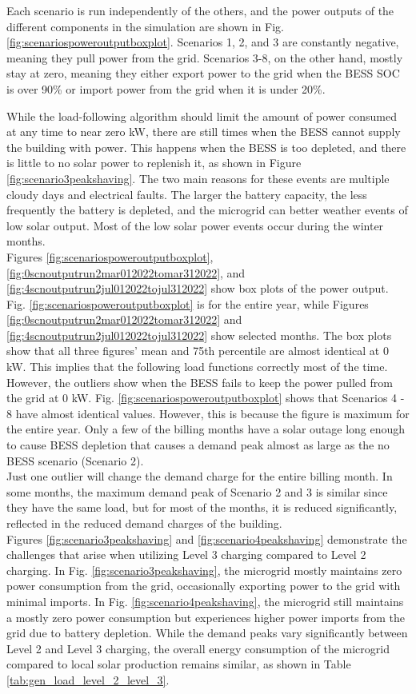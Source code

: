 \documentclass[conference, usletter]{IEEEtran}
\begin{document}
Each scenario is run independently of the others, and the power outputs of the different components in the simulation are shown in Fig. \ref{fig:scenariospoweroutputboxplot}. Scenarios 1, 2, and 3 are constantly negative, meaning they pull power from the grid. Scenarios 3-8, on the other hand, mostly stay at zero, meaning they either export power to the grid when the BESS SOC is over 90\% or import power from the grid when it is under 20\%.

While the load-following algorithm should limit the amount of power consumed at any time to near zero kW, there are still times when the BESS cannot supply the building with power. This happens when the BESS is too depleted, and there is little to no solar power to replenish it, as shown in Figure \ref{fig:scenario3peakshaving}. The two main reasons for these events are multiple cloudy days and electrical faults. The larger the battery capacity, the less frequently the battery is depleted, and the microgrid can better weather events of low solar output. Most of the low solar power events occur during the winter months.\\
\indent Figures \ref{fig:scenariospoweroutputboxplot}, \ref{fig:0scnoutputrun2mar012022tomar312022}, and \ref{fig:4scnoutputrun2jul012022tojul312022} show box plots of the power output. Fig. \ref{fig:scenariospoweroutputboxplot} is for the entire year, while Figures \ref{fig:0scnoutputrun2mar012022tomar312022} and \ref{fig:4scnoutputrun2jul012022tojul312022} show selected months. The box plots show that all three figures' mean and 75th percentile are almost identical at 0 kW. This implies that the following load functions correctly most of the time. However, the outliers show when the BESS fails to keep the power pulled from the grid at 0 kW. Fig. \ref{fig:scenariospoweroutputboxplot} shows that Scenarios 4 - 8 have almost identical values. However, this is because the figure is maximum for the entire year. Only a few of the billing months have a solar outage long enough to cause BESS depletion that causes a demand peak almost as large as the no BESS scenario (Scenario 2).\\
\indent Just one outlier will change the demand charge for the entire billing month. In some months, the maximum demand peak of Scenario 2 and 3 is similar since they have the same load, but for most of the months, it is reduced significantly, reflected in the reduced demand charges of the building. \\ 
\indent Figures \ref{fig:scenario3peakshaving} and \ref{fig:scenario4peakshaving} demonstrate the challenges that arise when utilizing Level 3 charging compared to Level 2 charging. In Fig. \ref{fig:scenario3peakshaving}, the microgrid mostly maintains zero power consumption from the grid, occasionally exporting power to the grid with minimal imports. In Fig. \ref{fig:scenario4peakshaving}, the microgrid still maintains a mostly zero power consumption but experiences higher power imports from the grid due to battery depletion. While the demand peaks vary significantly between Level 2 and Level 3 charging, the overall energy consumption of the microgrid compared to local solar production remains similar, as shown in Table \ref{tab:gen_load_level_2_level_3}.\\
\end{document}
